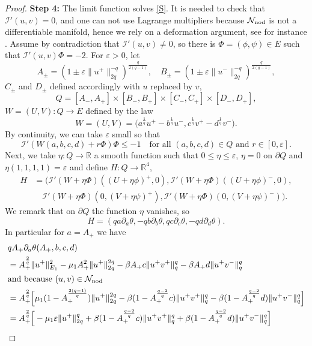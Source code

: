 \documentclass[reqno]{amsart}
\begin{document}
\begin{proof}
\noindent\textbf{Step 4:} The limit function solves \eqref{S}.
It is needed to check that $\mathcal I'(u,v)=0$, and
one can not use Lagrange multipliers because $\mathcal N_{\rm nod}$ is not a
differentiable manifold, hence we rely on a deformation argument, see for instance
\cite{CTV_AIHP}.
Assume by contradiction that $\mathcal I'(u,v)\neq 0$, so there is
$\Phi=(\phi, \psi)\in E$ such that $\mathcal I'(u,v) \Phi = -2$.
For $\varepsilon>0$, let
\[
A_{\pm}=\left(1\pm\varepsilon\|u^+\|_{2q}^{-q}\right)^{\frac{q}{2(q-1)}}, \quad
B_{\pm}=\left(1\pm\varepsilon\|u^-\|_{2q}^{-q}\right)^{\frac{q}{2(q-1)}},
\]
$C_{\pm}$ and $D_{\pm}$ defined accordingly with $u$ replaced by $v$,
\[
Q = [A_-,A_+]\times[B_-,B_+]\times[C_-,C_+]\times[D_-,D_+],
\]
$W=(U,V):Q\to E$ defined by the law
\[
W=(U,V)=\Big( a^{\frac{1}q}u^+ - b^{\frac{1}{q}}u^-, c^{\frac{1}q}v^+
- d^{\frac{1}q}v^-\Big) .
\]
By continuity, we can take $\varepsilon$ small so that
\begin{equation}\label{I<-1}
 \mathcal I'(W(a,b,c,d)+r\Phi) \Phi \le -1 \quad
  \text{for all } (a,b,c,d)\in Q \text{ and } r\in [0,\varepsilon].
\end{equation}
Next, we take $\eta:Q\to \mathbb{R}$ a smooth function such that $0\le \eta\le \varepsilon$,
$\eta=0$ on $\partial Q$ and $\eta(1,1,1,1)=\varepsilon$
and define $H : Q \to \mathbb{R}^4$,
\begin{align*}
H&=\Big( \mathcal I'(W+\eta\Phi) ((U+\eta\phi)^+,0),
 \mathcal I'(W+\eta\Phi) ((U+\eta\phi)^-,0),  \\
&\quad  \mathcal I'(W+\eta\Phi) (0,(V+\eta\psi)^+), \mathcal I'(W+\eta\Phi) (0,(V+\eta\psi)^-)
 \Big) .
\end{align*}
We remark that on $\partial Q$ the function $\eta$ vanishes, so
\[
H=\left(qa \partial_a\theta, -qb\partial_b\theta, qc\partial_c\theta,
-qd\partial_d\theta\right) .
\]
In particular for $a=A_+$ we have
\begin{align*}
&q A_+ \partial_a\theta(A_+,b,c,d) \\
&= A_+^{\frac{2}q}\|u^+\|_{E_1}^{2}-\mu_1A_+^2\|u^+\|_{2q}^{2q} -\beta A_+c\|u^+v^+\|_q^q
-\beta A_+d\|u^+v^-\|_q^q\\
 \intertext{and because $(u,v)\in \mathcal N_{\rm nod}$}
&= A_+^{\frac{2}q}\Big[ \mu_1(1-A_+^{\frac{2(q-1)}q}) \|u^+\|_{2q}^{2q}
 -\beta (1-A_+^{\frac{q-2}q}c) \|u^+v^+\|_q^q -\beta (1-A_+^{\frac{q-2}q}d)\|u^+v^-
  \|_q^q\Big] \\
&=A_+^{\frac{2}q}\Big[ -\mu_1 \varepsilon \|u^+\|_{2q}^{q} +\beta (1-A_+^{\frac{q-2}q}c)
 \|u^+v^+\|_q^q +\beta (1-A_+^{\frac{q-2}q}d)\|u^+v^-\|_q^q\Big]

\end{align*}
\end{proof}
\end{document}
